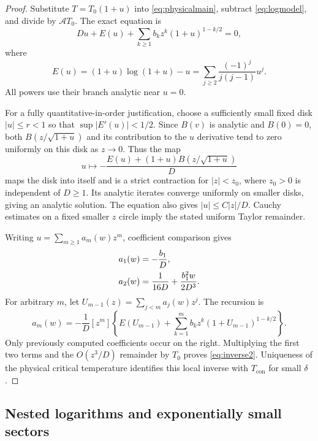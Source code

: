 \documentclass[11pt,a4paper]{article}
\numberwithin{equation}{section}
\theoremstyle{definition}
\newcommand{\con}{\mathrm{con}}
\newcommand{\Aconst}{\mathcal A}
\begin{document}
\begin{proof}
Substitute $T=T_0(1+u)$ into \eqref{eq:physicalmain}, subtract
\eqref{eq:logmodel}, and divide by $\Aconst T_0$. The exact equation is
\begin{equation}
 D u+E(u)+\sum_{k\ge1}b_k z^k(1+u)^{1-k/2}=0,
 \label{eq:inverseimplicit}
\end{equation}
where
\begin{equation}
 E(u)=(1+u)\log(1+u)-u
     =\sum_{j\ge2}\frac{(-1)^j}{j(j-1)}u^j.
 \label{eq:E}
\end{equation}
All powers use their branch analytic near $u=0$.

For a fully quantitative-in-order justification, choose a sufficiently
small fixed disk $|u|\le r<1$ so that
$\sup|E'(u)|<1/2$. Since $B(v)$ is analytic and $B(0)=0$, both
$B(z/\sqrt{1+u})$ and its contribution to the $u$ derivative tend to
zero uniformly on this disk as $z\to0$. Thus the map
\[
 u\longmapsto-\frac{E(u)+(1+u)B(z/\sqrt{1+u})}{D}
\]
maps the disk into itself and is a strict contraction for $|z|<z_0$,
where $z_0>0$ is independent of $D\ge1$. Its analytic iterates converge
uniformly on smaller disks, giving an analytic solution. The equation
also gives $|u|\le C|z|/D$. Cauchy estimates on a fixed smaller $z$
circle imply the stated uniform Taylor remainder.

Writing $u=\sum_{m\ge1}a_m(w)z^m$, coefficient comparison gives
\begin{align}
 a_1(w)&=-\frac{b_1}{D},\notag\\
 a_2(w)&=\frac1{16D}+\frac{b_1^2w}{2D^3}.
 \label{eq:a12}
\end{align}
For arbitrary $m$, let $U_{m-1}(z)=\sum_{j<m}a_j(w)z^j$. The recursion is
\begin{equation}
 a_m(w)=-\frac1D[z^m]\left\{
 E(U_{m-1})+\sum_{k=1}^{m}b_k z^k(1+U_{m-1})^{1-k/2}
 \right\}.
 \label{eq:inverserecursion}
\end{equation}
Only previously computed coefficients occur on the right. Multiplying
the first two terms and the $O(z^3/D)$ remainder by $T_0$ proves
\eqref{eq:inverse2}. Uniqueness of the physical critical temperature
identifies this local inverse with $T_{\con}$ for small $\delta$.
\end{proof}

\subsection{Nested logarithms and exponentially small sectors}
\end{document}
